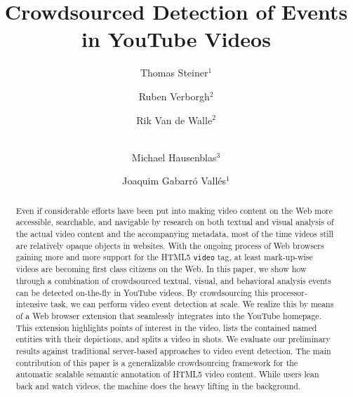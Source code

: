 \documentclass[runningheads,a4paper]{llncs}
\begin{document}
\mainmatter

\title{Crowdsourced Detection of Events in YouTube Videos}


%
%
\author{Thomas Steiner$^{1}$ \and Ruben Verborgh$^{2}$ \and Rik Van de Walle$^{2}$ \and \\Michael Hausenblas$^{3}$ \and Joaquim Gabarr\'{o} Vall\'{e}s$^{1}$}
%

\maketitle

\begin{abstract}
Even if considerable efforts have been put into making video content on the Web more accessible, searchable, and navigable by research on both textual and visual analysis of the actual video content and the accompanying metadata, most of the time videos still are relatively opaque objects in websites. With the ongoing process of Web browsers gaining more and more support for the HTML5 \texttt{video} tag, at least mark-up-wise videos are becoming first class citizens on the Web. In this paper, we show how through a combination of crowdsourced textual, visual, and behavioral analysis events can be detected on-the-fly in YouTube videos. By crowdsourcing this processor-intensive task, we can perform video event detection at scale. We realize this by means of a Web browser extension that seamlessly integrates into the YouTube homepage. This extension highlights points of interest in the video, lists the contained named entities with their depictions, and splits a video in shots. We evaluate our preliminary results against traditional server-based approaches to video event detection. The main contribution of this paper is a generalizable crowdsourcing framework for the automatic scalable semantic annotation of HTML5 video content.  While users lean back and watch videos, the machine does the heavy lifting in the background.
\end{abstract}
\end{document}
